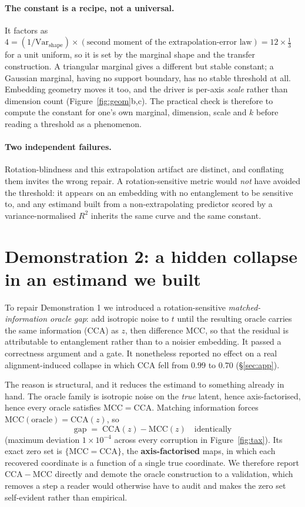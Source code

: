 \documentclass[10pt]{article}
\newcommand{\gap}{\ensuremath{\mathrm{CCA}\!-\!\mathrm{MCC}}}
\begin{document}
\paragraph{The constant is a recipe, not a universal.} It factors as
$4=(1/\mathrm{Var}_{\text{shape}})\times(\text{second moment of the extrapolation-error law})
=12\times\tfrac13$ for a unit uniform, so it is set by the marginal shape and the transfer
construction. A triangular marginal gives a different but stable constant; a Gaussian marginal, having
no support boundary, has no stable threshold at all. Embedding geometry moves it too, and the driver is
per-axis \emph{scale} rather than dimension count (Figure~\ref{fig:geom}b,c). The practical check is
therefore to compute the constant for one's own marginal, dimension, scale and $k$ before reading a
threshold as a phenomenon.

\paragraph{Two independent failures.} Rotation-blindness and this extrapolation artifact are distinct,
and conflating them invites the wrong repair. A rotation-sensitive metric would \emph{not} have avoided
the threshold: it appears on an embedding with no entanglement to be sensitive to, and any estimand
built from a non-extrapolating predictor scored by a variance-normalised $R^{2}$ inherits the same
curve and the same constant.

\section{Demonstration 2: a hidden collapse in an estimand we built}
\label{sec:gap}

To repair Demonstration 1 we introduced a rotation-sensitive \emph{matched-information oracle gap}: add
isotropic noise to $t$ until the resulting oracle carries the same information (CCA) as $z$, then
difference MCC, so that the residual is attributable to entanglement rather than to a noisier
embedding. It passed a correctness argument and a gate. It nonetheless reported no effect on a real
alignment-induced collapse in which CCA fell from $0.99$ to $0.70$ (\S\ref{sec:app}).

The reason is structural, and it reduces the estimand to something already in hand. The oracle family
is isotropic noise on the \emph{true} latent, hence axis-factorised, hence every oracle satisfies
$\mathrm{MCC}=\mathrm{CCA}$. Matching information forces $\mathrm{MCC}(\text{oracle})=\mathrm{CCA}(z)$,
so
\[
\text{gap}\;=\;\mathrm{CCA}(z)-\mathrm{MCC}(z)\quad\text{identically}
\]
(maximum deviation $1\times10^{-4}$ across every corruption in Figure~\ref{fig:tax}). Its exact zero set
is $\{\mathrm{MCC}=\mathrm{CCA}\}$, the \textbf{axis-factorised} maps, in which each recovered
coordinate is a function of a single true coordinate. We therefore report $\gap$ directly and demote
the oracle construction to a validation, which removes a step a reader would otherwise have to audit
and makes the zero set self-evident rather than empirical.
\end{document}
